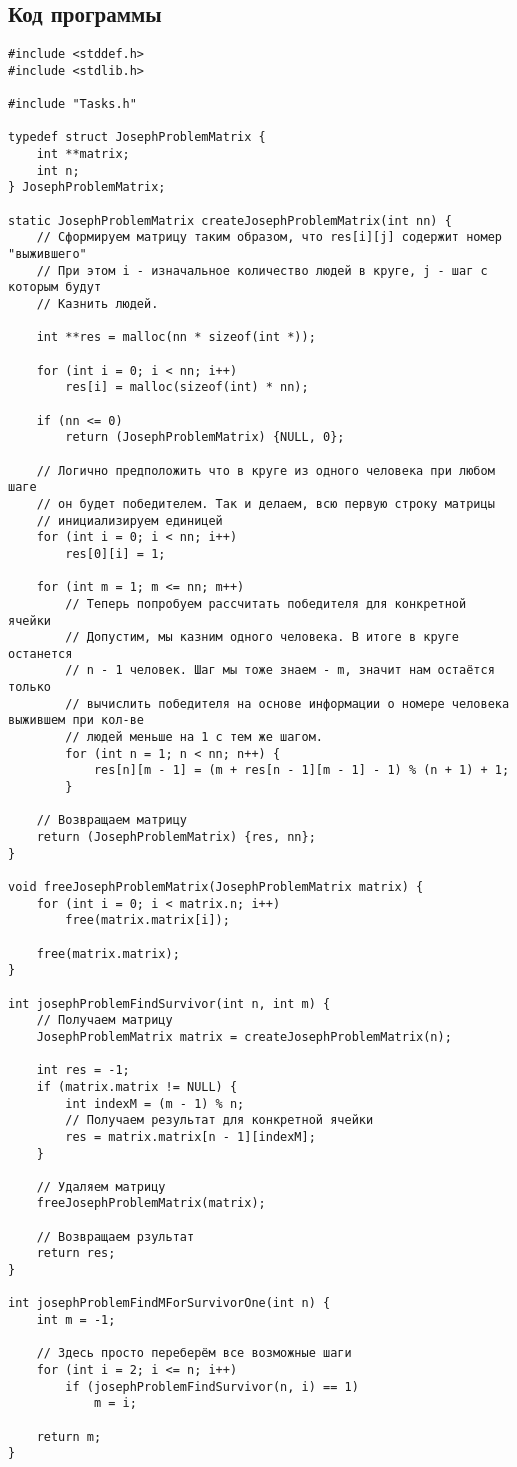 \documentclass[a4paper, 12pt, oneside]{article}
\begin{document}
    \subsection{Код программы}
    \begin{verbatim}
#include <stddef.h>
#include <stdlib.h>

#include "Tasks.h"

typedef struct JosephProblemMatrix {
    int **matrix;
    int n;
} JosephProblemMatrix;

static JosephProblemMatrix createJosephProblemMatrix(int nn) {
    // Сформируем матрицу таким образом, что res[i][j] содержит номер "выжившего"
    // При этом i - изначальное количество людей в круге, j - шаг с которым будут
    // Казнить людей.

    int **res = malloc(nn * sizeof(int *));

    for (int i = 0; i < nn; i++)
        res[i] = malloc(sizeof(int) * nn);

    if (nn <= 0)
        return (JosephProblemMatrix) {NULL, 0};

    // Логично предположить что в круге из одного человека при любом шаге
    // он будет победителем. Так и делаем, всю первую строку матрицы
    // инициализируем единицей
    for (int i = 0; i < nn; i++)
        res[0][i] = 1;

    for (int m = 1; m <= nn; m++)
        // Теперь попробуем рассчитать победителя для конкретной ячейки
        // Допустим, мы казним одного человека. В итоге в круге останется
        // n - 1 человек. Шаг мы тоже знаем - m, значит нам остаётся только
        // вычислить победителя на основе информации о номере человека выжившем при кол-ве
        // людей меньше на 1 с тем же шагом.
        for (int n = 1; n < nn; n++) {
            res[n][m - 1] = (m + res[n - 1][m - 1] - 1) % (n + 1) + 1;
        }

    // Возвращаем матрицу
    return (JosephProblemMatrix) {res, nn};
}

void freeJosephProblemMatrix(JosephProblemMatrix matrix) {
    for (int i = 0; i < matrix.n; i++)
        free(matrix.matrix[i]);

    free(matrix.matrix);
}

int josephProblemFindSurvivor(int n, int m) {
    // Получаем матрицу
    JosephProblemMatrix matrix = createJosephProblemMatrix(n);

    int res = -1;
    if (matrix.matrix != NULL) {
        int indexM = (m - 1) % n;
        // Получаем результат для конкретной ячейки
        res = matrix.matrix[n - 1][indexM];
    }

    // Удаляем матрицу
    freeJosephProblemMatrix(matrix);

    // Возвращаем рзультат
    return res;
}

int josephProblemFindMForSurvivorOne(int n) {
    int m = -1;

    // Здесь просто переберём все возможные шаги
    for (int i = 2; i <= n; i++)
        if (josephProblemFindSurvivor(n, i) == 1)
            m = i;

    return m;
}
    \end{verbatim}
\end{document}
